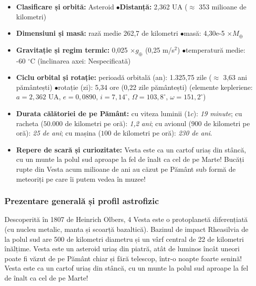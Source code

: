 \begin{tcolorbox}[orbitardata, title={\textbf{Repere esențiale: 4 Vesta}}]
\small
\begin{itemize}[leftmargin=1.4em, itemsep=2pt, topsep=2pt]
  \item \textbf{Clasificare și orbită:} Asteroid \quad$\bullet$\quad \textbf{Distanță:} 2,362 UA ($\approx$ 353 milioane de kilometri)
  \item \textbf{Dimensiuni și masă:} rază medie 262,7 de kilometri \quad$\bullet$\quad masă: 4,30e-5 $\times M_\oplus$
  \item \textbf{Gravitație și regim termic:} 0,025 $\times g_\oplus$ (0,25 m/s$^2$) \quad$\bullet$\quad temperatură medie: -60 $^\circ$C (înclinarea axei: Nespecificată)
  \item \textbf{Ciclu orbital și rotație:} perioadă orbitală (an): 1.325,75 zile ($\approx$ 3,63 ani pământești) \quad$\bullet$\quad rotație (zi): 5,34 ore (0,22 zile pământești) (elemente kepleriene: $a = 2,362$ UA, $e = 0,0890$, $i = 7,14^\circ$, $\Omega = 103,8^\circ$, $\omega = 151,2^\circ$)
  \item \textbf{Durata călătoriei de pe Pământ:} cu viteza luminii ($1c$): \emph{19 minute}; cu racheta ($50.000$ de kilometri pe oră): \emph{1,2 ani}; cu avionul ($900$ de kilometri pe oră): \emph{25 de ani}; cu mașina ($100$ de kilometri pe oră): \emph{230 de ani}.
  \item \textbf{Repere de scară și curiozitate:} Vesta este ca un cartof uriaș din stâncă, cu un munte la polul sud aproape la fel de înalt ca cel de pe Marte! Bucăți rupte din Vesta acum milioane de ani au căzut pe Pământ sub formă de meteoriți pe care îi putem vedea în muzee!
\end{itemize}
\end{tcolorbox}

\subsubsection*{Prezentare generală și profil astrofizic}
Descoperită în 1807 de Heinrich Olbers, 4 Vesta este o protoplanetă diferențiată (cu nucleu metalic, manta și scoarță bazaltică). Bazinul de impact Rheasilvia de la polul sud are 500 de kilometri diametru și un vârf central de 22 de kilometri înălțime. Vesta este un asteroid uriaș din piatră, atât de luminos încât uneori poate fi văzut de pe Pământ chiar și fără telescop, într-o noapte foarte senină! Vesta este ca un cartof uriaș din stâncă, cu un munte la polul sud aproape la fel de înalt ca cel de pe Marte!

